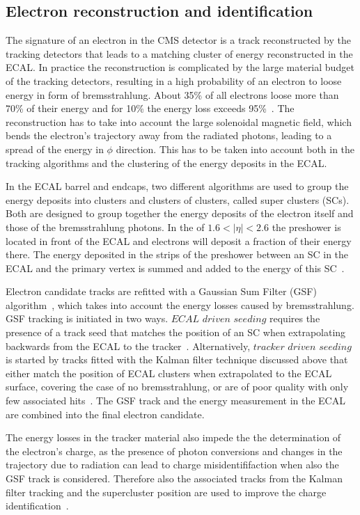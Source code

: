 \subsection{Electron reconstruction and identification}
The signature of an electron in the CMS detector is a track reconstructed by the tracking detectors that leads to a matching cluster of energy reconstructed in the ECAL. In practice the reconstruction is complicated by the large material budget of the tracking detectors, resulting in a high probability of an electron to loose energy in form of bremsstrahlung. About 35\% of all electrons loose more than 70\% of their energy and for 10\% the energy loss exceeds 95\%~\cite{Baffioni:2006cd}. The reconstruction has to take into account the large solenoidal magnetic field, which bends the electron's trajectory away from the radiated photons, leading to a spread of the energy in $\phi$ direction. This has to be taken into account both in the tracking algorithms and the clustering of the energy deposits in the ECAL. 

In the ECAL barrel and endcaps, two different algorithms are used to group the energy deposits into clusters and clusters of clusters, called super clusters (SCs). Both are designed to group together the energy deposits of the electron itself and those of the bremsstrahlung photons. In the of $1.6 < |\eta| < 2.6$ the preshower is located in front of the ECAL and electrons will deposit a fraction of their energy there. The energy deposited in the strips of the preshower between an SC in the ECAL and the primary vertex is summed and added to the energy of this SC~\cite{Anderson:1365024}. 

Electron candidate tracks are refitted with a Gaussian Sum Filter (GSF) algorithm~\cite{FruhwirtGSFCMS}, which takes into account the energy losses caused by bremsstrahlung. GSF tracking is initiated in two ways. $\textit{ECAL driven seeding}$ requires the presence of a track seed that matches the position of an SC when extrapolating backwards from the ECAL to the tracker~\cite{Baffioni:2006cd}. Alternatively, $\textit{tracker driven seeding}$ is started by tracks fitted with the Kalman filter technique discussed above that either match the position of ECAL clusters when extrapolated to the ECAL surface, covering the case of no bremsstrahlung, or are of poor quality with only few associated hits~\cite{Chatrchyan:2014fea}. The GSF track and the energy measurement in the ECAL are combined into the final electron candidate. 

The energy losses in the tracker material also impede the the determination of the electron's charge, as the presence of photon conversions and changes in the trajectory due to radiation can lead to charge misidentififaction when also the GSF track is considered. Therefore also the associated tracks from the Kalman filter tracking and the supercluster position are used to improve the charge identification~\cite{Khachatryan:2015hwa}.

